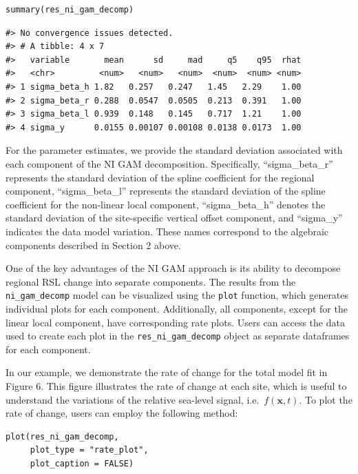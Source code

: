 \begin{verbatim}
summary(res_ni_gam_decomp)
\end{verbatim}

\begin{verbatim}
#> No convergence issues detected.
#> # A tibble: 4 x 7
#>   variable       mean      sd     mad     q5    q95  rhat
#>   <chr>         <num>   <num>   <num>  <num>  <num> <num>
#> 1 sigma_beta_h 1.82   0.257   0.247   1.45   2.29    1.00
#> 2 sigma_beta_r 0.288  0.0547  0.0505  0.213  0.391   1.00
#> 3 sigma_beta_l 0.939  0.148   0.145   0.717  1.21    1.00
#> 4 sigma_y      0.0155 0.00107 0.00108 0.0138 0.0173  1.00
\end{verbatim}

\normalsize

For the parameter estimates, we provide the standard deviation associated with each component of the NI GAM decomposition. Specifically, ``sigma\_beta\_r'' represents the standard deviation of the spline coefficient for the regional component, ``sigma\_beta\_l'' represents the standard deviation of the spline coefficient for the non-linear local component, ``sigma\_beta\_h'' denotes the standard deviation of the site-specific vertical offset component, and ``sigma\_y'' indicates the data model variation. These names correspond to the algebraic components described in Section 2 above.

One of the key advantages of the NI GAM approach is its ability to decompose regional RSL change into separate components. The results from the \texttt{ni\_gam\_decomp} model can be visualized using the \texttt{plot} function, which generates individual plots for each component. Additionally, all components, except for the linear local component, have corresponding rate plots. Users can access the data used to create each plot in the \texttt{res\_ni\_gam\_decomp} object as separate dataframes for each component.

In our example, we demonstrate the rate of change for the total model fit in Figure 6. This figure illustrates the rate of change at each site, which is useful to understand the variations of the relative sea-level signal, i.e.~\(f(\mathbf{x},t)\). To plot the rate of change, users can employ the following method:
\scriptsize

\begin{verbatim}
plot(res_ni_gam_decomp, 
     plot_type = "rate_plot",
     plot_caption = FALSE)
\end{verbatim}

